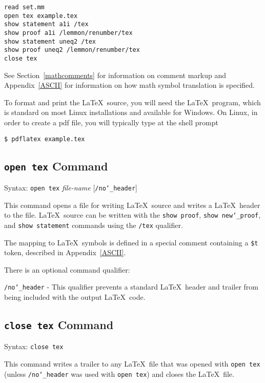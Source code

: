 \begin{verbatim}
read set.mm
open tex example.tex
show statement a1i /tex
show proof a1i /lemmon/renumber/tex
show statement uneq2 /tex
show proof uneq2 /lemmon/renumber/tex
close tex
\end{verbatim}

See Section~\ref{mathcomments} for information on comment markup and
Appendix~\ref{ASCII} for information on how math symbol translation is
specified.

To format and print the \LaTeX\ source, you will need the \LaTeX\
program, which is standard on most Linux installations and available for
Windows.  On Linux, in order to create a {\sc pdf} file, you will
typically type at the shell prompt
\begin{verbatim}
$ pdflatex example.tex
\end{verbatim}

\subsection{\texttt{open tex} Command}
Syntax:  \texttt{open tex} {\em file-name} [\texttt{/no{\char`\_}header}]

This command opens a file for writing \LaTeX\
source and writes a \LaTeX\ header to the file.
\LaTeX\ source can be written with the \texttt{show proof}, \texttt{show
new{\char`\_}proof}, and \texttt{show statement} commands using the
\texttt{/tex} qualifier.

The mapping to \LaTeX\ symbols is defined in a special comment
containing a \texttt{\$t} token, described in Appendix~\ref{ASCII}.

There is an optional command qualifier:

    \texttt{/no{\char`\_}header} - This qualifier prevents a standard
        \LaTeX\ header and trailer
        from being included with the output \LaTeX\ code.


\subsection{\texttt{close tex} Command}
Syntax:  \texttt{close tex}

This command writes a trailer to any \LaTeX\ file
that was opened with \texttt{open tex} (unless
\texttt{/no{\char`\_}header} was used with \texttt{open tex}) and closes
the \LaTeX\ file.


